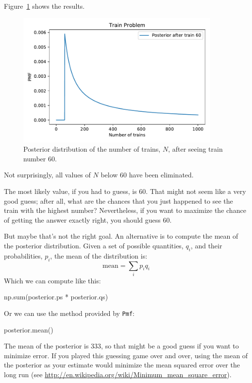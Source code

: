 \documentclass[12pt]{book}
\theoremstyle{exercise}
\newcommand{\py}[1]{{\tt #1}}%
\begin{document}
Figure~\ref{fig04-01} shows the results.

\begin{figure}
\centerline{\includegraphics[width=4in]{figs/fig04-01.pdf}}
\caption{Posterior distribution of the number of trains, $N$, after seeing train number 60.}
\label{fig04-01}
\end{figure}

Not surprisingly, all values of $N$ below 60 have been eliminated.

The most likely value, if you had to guess, is 60.
That might not seem like a very good guess; after all, what are the chances that you just happened to see the train with the highest number?
Nevertheless, if you want to maximize the chance of getting
the answer exactly right, you should guess 60.

But maybe that's not the right goal.
An alternative is to compute the mean of the posterior distribution.
Given a set of possible quantities, $q_i$, and their probabilities, $p_i$, the mean of the distribution is:
%
\[ \mathrm{mean} = \sum_i p_i q_i \]
%
Which we can compute like this:

\begin{code}
np.sum(posterior.ps * posterior.qs)
\end{code}

Or we can use the method provided by \py{Pmf}:

\begin{code}
posterior.mean()
\end{code}

The mean of the posterior is 333, so that might be a good guess if you want to minimize error.
If you played this guessing game over and over, using the mean of the posterior as your estimate would minimize the mean squared error over the long run (see \url{http://en.wikipedia.org/wiki/Minimum_mean_square_error}).
\end{document}

